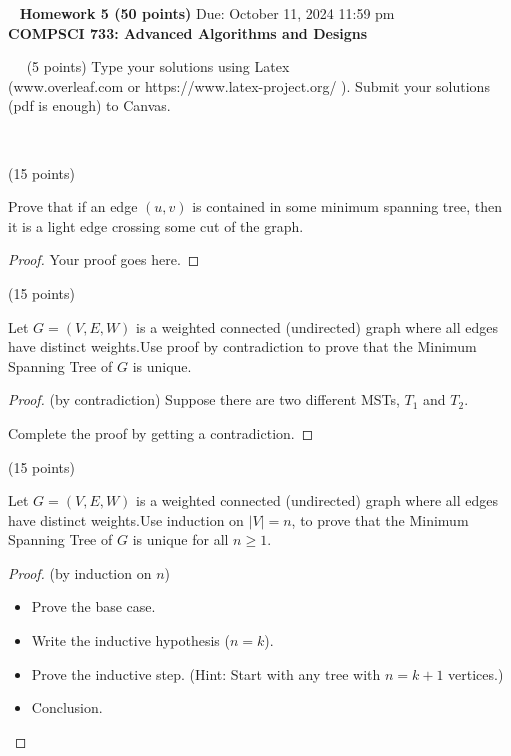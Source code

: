 \documentclass[12pt]{article}
\newcommand{\vs}{\vspace{2mm}}
\newcommand{\ls}{\vspace{5mm}}
\newcommand{\bc}{\begin{center}}
\newcommand{\ec}{\end{center}}
\begin{document}
\bc\ 
 { \bf Homework 5 (50 points) }  Due: October 11, 2024 11:59 pm\\
 { \bf COMPSCI 733: Advanced Algorithms and Designs } \\ 
\ec\
\ls\
 (5 points)
Type your solutions using Latex \\
(www.overleaf.com or https://www.latex-project.org/ ). Submit your solutions (pdf is enough)  to Canvas. 

\vs\

 (15 points)
\vs\

Prove that if an edge $(u,v)$ is contained in some minimum spanning tree, then it is
a light edge crossing some cut of the graph.
\vs\

\begin{proof}   
Your proof goes here.
\end{proof}

 (15 points)
\vs\

Let  $G = (V,E,W)$ is a weighted connected (undirected) graph where all edges have distinct weights.Use proof by contradiction to prove that the Minimum Spanning Tree of $G$ is unique. 

\begin{proof} (by contradiction)
Suppose there are two different MSTs, $T_1$ and $T_2$. 

Complete the proof by getting a contradiction.
\end{proof}


 (15 points)
\vs\

Let  $G = (V,E,W)$ is a weighted connected (undirected) graph where all edges have distinct weights.Use induction on $|V|=n$, to prove that the Minimum Spanning Tree of $G$ is unique for all $n \geq 1$. 

\begin{proof} (by induction on $n$)

    \begin{itemize}
    \item Prove the base case.
    \item Write the inductive hypothesis ($n=k$).
    \item Prove the inductive step. (Hint: Start with any tree with $n= k+1$ vertices.)
    \item Conclusion. 
    \end{itemize}

\end{proof}
\end{document}
